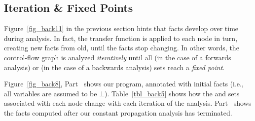 \documentclass[12pt]{report}
\begin{document}
\subsection{Iteration \& Fixed Points}
\label{back_subsec_iter}

Figure~\ref{fig_back11} in the previous section hints that facts
develop over time during analysis. In fact, the transfer function is
applied to each node in turn, creating new facts from old, until the
facts stop changing. In other words, the control-flow graph is
analyzed \emph{iteratively} until all \out (in the case of a forwards
analysis) or \inE (in the case of a backwards analysis) sets reach a
\emph{fixed point}.

Figure~\ref{fig_back8}, Part~ shows our
program, annotated with initial facts (i.e., all variables are assumed
to be $\bot$). Table~\ref{tbl_back5} shows how the \inE and \out sets
associated with each node change with each iteration of the analysis.
Part~ shows the facts computed after our
constant propagation analysis has terminated.
\end{document}
